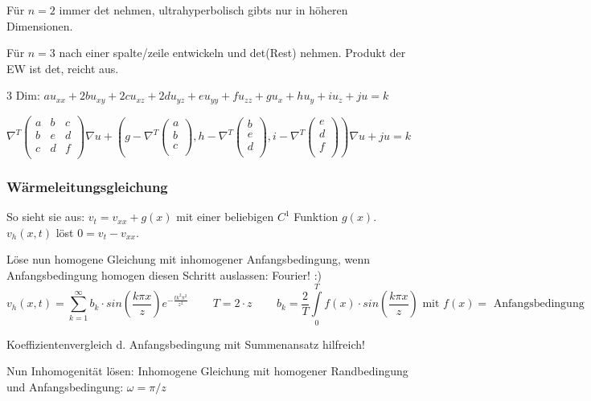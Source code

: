 \documentclass[10pt,a4paper]{article}
\begin{document}
Für $n=2$ immer det nehmen, ultrahyperbolisch gibts nur in höheren Dimensionen.

Für $n=3$ nach einer spalte/zeile entwickeln und det(Rest) nehmen. Produkt der EW ist det, reicht aus.

3 Dim: $au_{xx}+2bu_{xy}+2cu_{xz}+2du_{yz}+eu_{yy}+fu_{zz}+gu_x +hu_y+iu_z+ju=k$

$\nabla^T
\begin{pmatrix}
a & b&c \\
b & e&d \\
c&d&f\\
\end{pmatrix}
\nabla u+\left(g - \nabla^T \begin{pmatrix}
a\\b\\c\\
\end{pmatrix}, h - \nabla^T \begin{pmatrix}
b\\e\\d\\
\end{pmatrix},i - \nabla^T \begin{pmatrix}
e\\d\\f\\
\end{pmatrix}\right)\nabla u + ju = k$

\subsubsection{Wärmeleitungsgleichung}
So sieht sie aus: $v_t = v_{xx} + g(x)$ mit einer beliebigen $C^1$ Funktion $g(x)$. $v_h(x,t)$ löst $0 = v_t - v_{xx}$.

Löse nun homogene Gleichung mit inhomogener Anfangsbedingung, wenn Anfangsbedingung homogen diesen Schritt auslassen: Fourier! :)
\[v_h(x,t) = \sum\limits_{k=1}^{\infty} b_k \cdot sin\left(\frac{k \pi x}{z} \right) e^{-\frac{t k^2 \pi^2}{z^2}}
\,\,\,\,\,\,\,\,\,\,\,\,\,
T=2\cdot z
\,\,\,\,\,\,\,\,\,\,\,\,\,
b_k = \frac{2}{T} \int\limits_0^T f(x) \cdot sin\left( \frac{k \pi x}{z}\right) \mbox{ mit } f(x) = \mbox{ Anfangsbedingung}
\]

Koeffizientenvergleich d. Anfangsbedingung mit Summenansatz hilfreich!

Nun Inhomogenität lösen: Inhomogene Gleichung mit homogener Randbedingung und Anfangsbedingung: $\omega = \pi / z$
\end{document}
